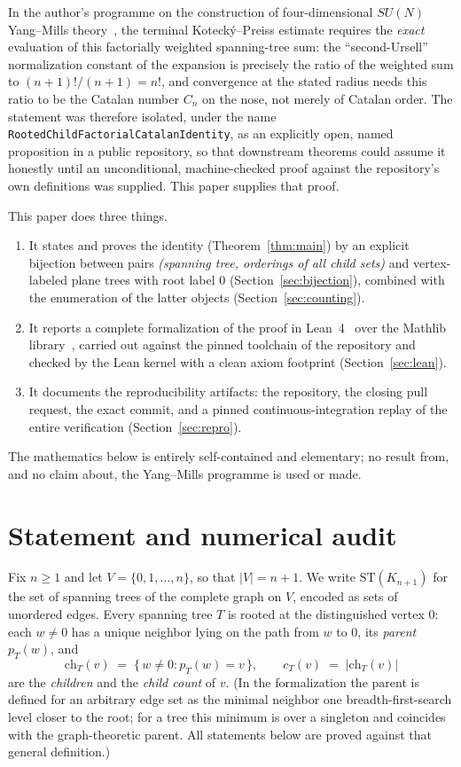 \documentclass[11pt]{article}
\theoremstyle{remark}
\theoremstyle{definition}
\begin{document}
In the author's programme on the construction of four-dimensional $SU(N)$
Yang--Mills theory~\cite{Eriksson2026Master,Eriksson2026KP}, the terminal
Koteck\'y--Preiss estimate requires the \emph{exact} evaluation of this
factorially weighted spanning-tree sum: the ``second-Ursell'' normalization
constant of the expansion is precisely the ratio of the weighted sum to
$(n+1)!/(n+1) = n!$, and convergence at the stated radius needs this ratio to
be the Catalan number $C_n$ on the nose, not merely of Catalan order.  The
statement was therefore isolated, under the name
\texttt{RootedChildFactorialCatalanIdentity}, as an explicitly open, named
proposition in a public repository, so that downstream theorems could assume
it honestly until an unconditional, machine-checked proof against the
repository's own definitions was supplied.  This paper supplies that proof.

This paper does three things.
\begin{enumerate}
  \item It states and proves the identity
    (Theorem~\ref{thm:main}) by an explicit bijection between pairs
    \emph{(spanning tree, orderings of all child sets)} and vertex-labeled
    plane trees with root label $0$ (Section~\ref{sec:bijection}), combined
    with the enumeration of the latter objects
    (Section~\ref{sec:counting}).
  \item It reports a complete formalization of the proof in
    Lean~4~\cite{Lean4} over the Mathlib library~\cite{mathlib}, carried out
    against the pinned toolchain of the repository and checked by
    the Lean kernel with a clean axiom footprint
    (Section~\ref{sec:lean}).
  \item It documents the reproducibility artifacts: the repository, the
    closing pull request, the exact commit, and a pinned
    continuous-integration replay of the entire verification
    (Section~\ref{sec:repro}).
\end{enumerate}
The mathematics below is entirely self-contained and elementary; no result
from, and no claim about, the Yang--Mills programme is used or made.

\section{Statement and numerical audit}\label{sec:statement}

Fix $n \ge 1$ and let $V = \{0,1,\dots,n\}$, so that $|V| = n+1$.  We write
$\mathrm{ST}(K_{n+1})$ for the set of spanning trees of the complete graph on
$V$, encoded as sets of unordered edges.  Every spanning tree $T$ is rooted at
the distinguished vertex $0$: each $w \neq 0$ has a unique neighbor lying on
the path from $w$ to $0$, its \emph{parent} $p_T(w)$, and
\[
  \mathrm{ch}_T(v) \;=\; \{\, w \neq 0 : p_T(w) = v \,\}, \qquad
  c_T(v) \;=\; |\mathrm{ch}_T(v)|
\]
are the \emph{children} and the \emph{child count} of $v$.  (In the
formalization the parent is defined for an arbitrary edge set as the minimal
neighbor one breadth-first-search level closer to the root; for a tree this
minimum is over a singleton and coincides with the graph-theoretic parent.
All statements below are proved against that general definition.)
\end{document}

